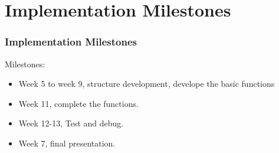 \documentclass{beamer}
\begin{document}
\section{Implementation Milestones}
\begin{frame}\frametitle{Implementation Milestones}
Milestones:
\begin{itemize}
\item Week 5 to week 9, structure development, develope the basic functions
\item Week 11, complete the functions.
\item Week 12-13, Test and debug.
\item Week 7, final presentation.
\end{itemize}
\end{frame}
\end{document}
